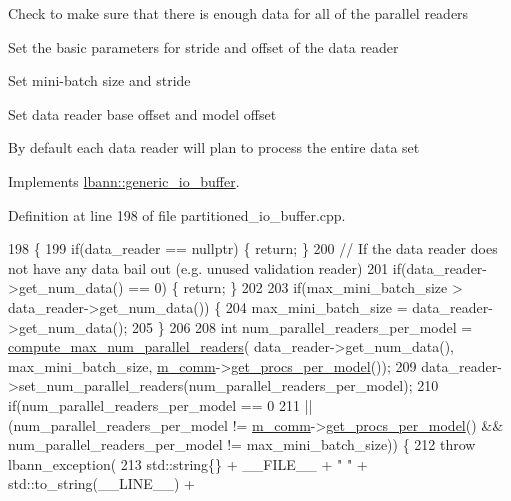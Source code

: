 Check to make sure that there is enough data for all of the parallel readers

Set the basic parameters for stride and offset of the data reader

Set mini-\/batch size and stride

Set data reader base offset and model offset

By default each data reader will plan to process the entire data set 

Implements \hyperlink{classlbann_1_1generic__io__buffer_a4c71135fada7f0da0b315d538d327e59}{lbann\+::generic\+\_\+io\+\_\+buffer}.



Definition at line 198 of file partitioned\+\_\+io\+\_\+buffer.\+cpp.


\begin{DoxyCode}
198                                                                                                            
                                     \{
199   \textcolor{keywordflow}{if}(data\_reader == \textcolor{keyword}{nullptr}) \{ \textcolor{keywordflow}{return}; \}
200   \textcolor{comment}{// If the data reader does not have any data bail out (e.g. unused validation reader)}
201   \textcolor{keywordflow}{if}(data\_reader->get\_num\_data() == 0) \{ \textcolor{keywordflow}{return}; \}
202 
203   \textcolor{keywordflow}{if}(max\_mini\_batch\_size > data\_reader->get\_num\_data()) \{
204     max\_mini\_batch\_size = data\_reader->get\_num\_data();
205   \}
206 
208   \textcolor{keywordtype}{int} num\_parallel\_readers\_per\_model = \hyperlink{classlbann_1_1partitioned__io__buffer_a5048100fb7cdc13908ecba6b4415b977}{compute\_max\_num\_parallel\_readers}(
      data\_reader->get\_num\_data(), max\_mini\_batch\_size, \hyperlink{classlbann_1_1generic__io__buffer_a2e4a46c85c8b30e10b1cc5acaa2c4cca}{m\_comm}->\hyperlink{classlbann_1_1lbann__comm_a5755dfdfc6377b4cae5ef8f7819e17de}{get\_procs\_per\_model}());
209   data\_reader->set\_num\_parallel\_readers(num\_parallel\_readers\_per\_model);
210   \textcolor{keywordflow}{if}(num\_parallel\_readers\_per\_model == 0
211      || (num\_parallel\_readers\_per\_model != \hyperlink{classlbann_1_1generic__io__buffer_a2e4a46c85c8b30e10b1cc5acaa2c4cca}{m\_comm}->\hyperlink{classlbann_1_1lbann__comm_a5755dfdfc6377b4cae5ef8f7819e17de}{get\_procs\_per\_model}() && 
      num\_parallel\_readers\_per\_model != max\_mini\_batch\_size)) \{
212     \textcolor{keywordflow}{throw} lbann\_exception(
213       std::string\{\} + \_\_FILE\_\_ + \textcolor{stringliteral}{" "} + std::to\_string(\_\_LINE\_\_) +

\end{DoxyCode}

